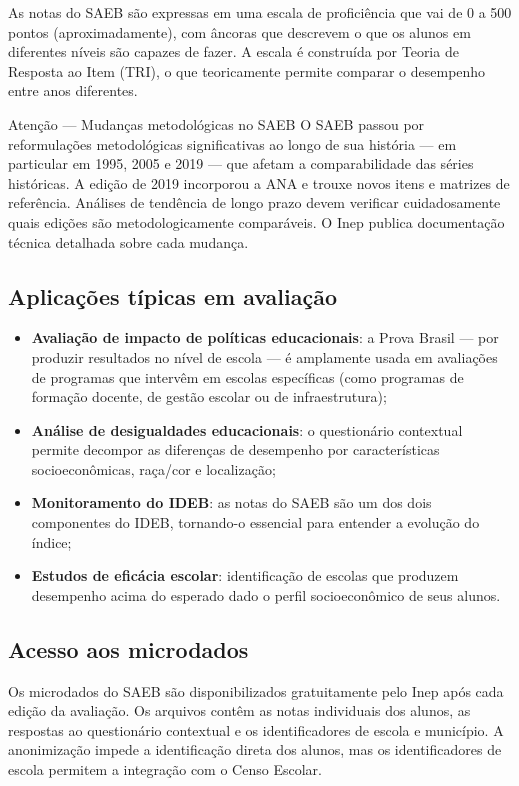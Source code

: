 As notas do SAEB são expressas em uma escala de proficiência que vai de 0 a 500 pontos (aproximadamente), com âncoras que descrevem o que os alunos em diferentes níveis são capazes de fazer. A escala é construída por Teoria de Resposta ao Item (TRI), o que teoricamente permite comparar o desempenho entre anos diferentes.

\begin{boxatencao}{Atenção — Mudanças metodológicas no SAEB}
O SAEB passou por reformulações metodológicas significativas ao longo de sua história — em particular em 1995, 2005 e 2019 — que afetam a comparabilidade das séries históricas. A edição de 2019 incorporou a ANA e trouxe novos itens e matrizes de referência. Análises de tendência de longo prazo devem verificar cuidadosamente quais edições são metodologicamente comparáveis. O Inep publica documentação técnica detalhada sobre cada mudança.
\end{boxatencao}

\subsection{Aplicações típicas em avaliação}

\begin{itemize}
  \item \textbf{Avaliação de impacto de políticas educacionais}: a Prova Brasil — por produzir resultados no nível de escola — é amplamente usada em avaliações de programas que intervêm em escolas específicas (como programas de formação docente, de gestão escolar ou de infraestrutura);
  \item \textbf{Análise de desigualdades educacionais}: o questionário contextual permite decompor as diferenças de desempenho por características socioeconômicas, raça/cor e localização;
  \item \textbf{Monitoramento do IDEB}: as notas do SAEB são um dos dois componentes do IDEB, tornando-o essencial para entender a evolução do índice;
  \item \textbf{Estudos de eficácia escolar}: identificação de escolas que produzem desempenho acima do esperado dado o perfil socioeconômico de seus alunos.
\end{itemize}

\subsection{Acesso aos microdados}

Os microdados do SAEB são disponibilizados gratuitamente pelo Inep após cada edição da avaliação. Os arquivos contêm as notas individuais dos alunos, as respostas ao questionário contextual e os identificadores de escola e município. A anonimização impede a identificação direta dos alunos, mas os identificadores de escola permitem a integração com o Censo Escolar.

